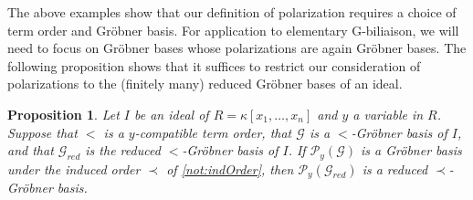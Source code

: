 \documentclass[12pt, reqno]{amsart}
\numberwithin{equation}{section}
\newtheorem{proposition}[theorem]{Proposition}
\newtheorem{Main Conjecture}[theorem]{Main Conjecture}
\theoremstyle{definition}
\theoremstyle{plain}
\newcommand{\G}{\mathcal{G}}
\renewcommand{\P}{\mathcal{P}}
\begin{document}
The above examples show that our definition of polarization requires a choice of term order and Gr\"obner basis.  For application to elementary G-biliaison, we will need to focus on Gr\"obner bases whose polarizations are again Gr\"obner bases. The following proposition shows that it suffices to restrict our consideration of polarizations to the (finitely many) reduced Gr\"obner bases of an ideal. 


\begin{proposition}
    \label{prop:redSuffices}
    Let $I$ be an ideal of $R=\kappa[x_1, \ldots, x_n]$ and  $y$ a variable in $R$.  
    Suppose that $<$ is a $y$-compatible term order, that $\G$ is a $<$-Gr\"obner basis of $I$, and that $\G_{red}$ is the reduced $<$-Gr\"obner basis of $I$.  If $\P_y(\G)$ is a Gr\"obner basis under the induced order $\prec$ of \cref{not:indOrder}, then $\P_y(\G_{red})$ is a reduced $\prec$-Gr\"obner basis.
\end{proposition}
\end{document}
